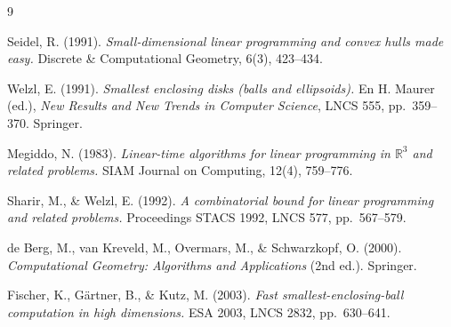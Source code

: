 \documentclass[11pt,a4paper]{article}
\theoremstyle{definition}
\theoremstyle{remark}
\begin{document}
\begin{thebibliography}{9}

  Seidel, R. (1991).
  \textit{Small-dimensional linear programming and convex hulls made easy.}
  Discrete \& Computational Geometry, 6(3), 423--434.

  Welzl, E. (1991).
  \textit{Smallest enclosing disks (balls and ellipsoids).}
  En H. Maurer (ed.), \textit{New Results and New Trends in Computer Science},
  LNCS 555, pp.\ 359--370. Springer.

  Megiddo, N. (1983).
  \textit{Linear-time algorithms for linear programming in $\mathbb{R}^3$
  and related problems.}
  SIAM Journal on Computing, 12(4), 759--776.

  Sharir, M., \& Welzl, E. (1992).
  \textit{A combinatorial bound for linear programming and related problems.}
  Proceedings STACS 1992, LNCS 577, pp.\ 567--579.

  de Berg, M., van Kreveld, M., Overmars, M., \& Schwarzkopf, O. (2000).
  \textit{Computational Geometry: Algorithms and Applications} (2nd ed.).
  Springer.

  Fischer, K., G{\"a}rtner, B., \& Kutz, M. (2003).
  \textit{Fast smallest-enclosing-ball computation in high dimensions.}
  ESA 2003, LNCS 2832, pp.\ 630--641.

\end{thebibliography}
\end{document}
